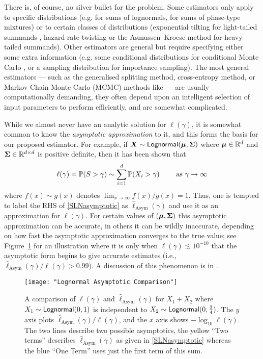 There is, of course, no silver bullet for the problem. Some estimators only apply to specific distributions (e.g. \cite{botev2017fast} for sums of lognormals, \cite{yao2016estimating} for sums of phase-type mixtures) or to certain classes of distributions (exponential tilting for light-tailed summands \cite{kroese2013handbook,asmussen2007stochastic}, hazard-rate twisting or the Asmussen--Kroese method \cite{asmussen2006improved} for heavy-tailed summands). Other estimators are general but require specifying either some extra information (e.g. some conditional distributions for conditional Monte Carlo \cite{asmussen2017conditional}, or a sampling distribution for importance sampling). The most general estimators --- such as the generalised splitting method, cross-entropy method, or Markov Chain Monte Carlo (MCMC) methods like \cite{chan2012improved} --- are usually computationally demanding, they often depend upon an intelligent selection of input parameters to perform efficiently, and are somewhat complicated.

While we almost never have an analytic solution for $\ell(\gamma)$, it is somewhat common to know the \emph{asymptotic approximation} to it, and this forms the basis for our proposed estimator. For example, if $\bm{X} \sim \mathsf{Lognormal}(\bm{\mu}, \bm{\Sigma})$ where $\bm{\mu} \in \mathbb{R}^d$ and $\bm{\Sigma} \in \mathbb{R}^{d \times d}$ is positive definite, then it has been shown that \cite{asmussen2008asymptotics}
\begin{equation} \label{SLNasymptotic}
\ell(\gamma) = \operatorname{{\mathbb P}}(S > \gamma) \sim \sum_{i=1}^d \operatorname{{\mathbb P}}(X_i > \gamma) \qquad \text{ as } \gamma \to \infty
\end{equation}
where $f(x) \sim g(x)$ denotes $\lim_{x \to \infty} f(x)/g(x) = 1$. Thus, one is tempted to label the RHS of \eqref{SLNasymptotic} as $\hat{\ell}_{\mathrm{Asym}}(\gamma)$ and use it as an approximation for $\ell(\gamma)$. For certain values of $(\bm{\mu},\bm{\Sigma})$ this asymptotic approximation can be accurate, in others it can be wildly inaccurate, depending on how fast the asymptotic approximation converges to the true value; see Figure~\ref{fig:slow_convergence} for an illustration where it is only when $\ell(\gamma) \lesssim 10^{-10}$ that the asymptotic form begins to give accurate estimates (i.e., $\hat{\ell}_{\mathrm{Asym}}(\gamma) / \ell(\gamma) > 0.99$). A discussion of this phenomenon is in \cite{botev2017fast}.

\begin{figure}
\centering
\texttt{[image: "Lognormal Asymptotic Comparison"]}
\caption{A comparison of $\ell(\gamma)$ and $\hat{\ell}_{\text{Asym}}(\gamma)$ for $X_1+X_2$ where $X_1 \sim \mathsf{Lognormal}(0, 1)$ is independent to $X_2\sim\mathsf{Lognormal}(0,\frac{3}{4})$. The $y$ axis plots $\hat{\ell}_{\text{Asym}}(\gamma) / \ell(\gamma)$, and the $x$ axis shows ${-}\log_{10} \ell(\gamma)$. The two lines describe two possible asymptotics, the yellow ``Two terms'' describes $\hat{\ell}_{\text{Asym}}(\gamma)$ as given in \eqref{SLNasymptotic} whereas the blue ``One Term'' uses just the first term of this sum.}
\label{fig:slow_convergence}
\end{figure}


